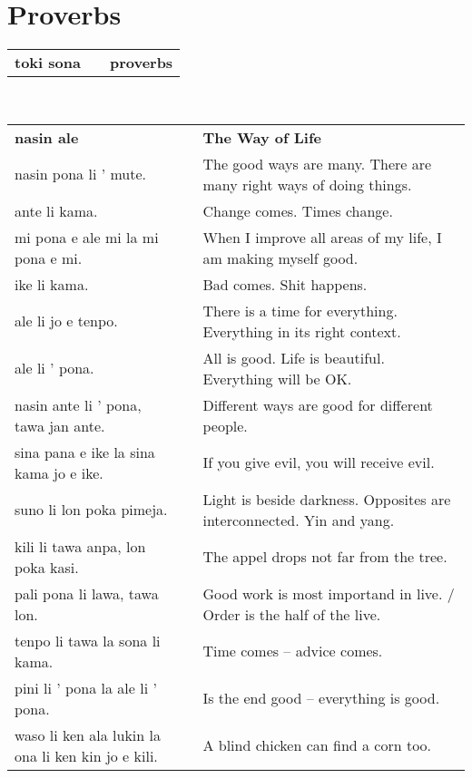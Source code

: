 %
\section{Proverbs}
%
\begin{supertabular}{p{6cm}|ll}
\textbf{toki sona} && \textbf{proverbs} \\
\end{supertabular} \\
%
\begin{supertabular}{p{6cm}|ll}
\textbf{nasin ale} && \textbf{The Way of Life} \\
nasin pona li ' mute. && The good ways are many. There are many right ways of doing things. \\
ante li kama.  && Change comes. Times change.  \\
mi pona e ale mi la mi pona e mi.  && When I improve all areas of my life, I am making myself good.  \\
ike li kama. && Bad comes. Shit happens.  \\ 
ale li jo e tenpo.  && There is a time for everything. Everything in its right context. \\
ale li ' pona.  && All is good. Life is beautiful. Everything will be OK.  \\
nasin ante li ' pona, tawa jan ante. && Different ways are good for different people. \\ 
sina pana e ike la sina kama jo e ike. && If you give evil, you will receive evil. \\
suno li lon poka pimeja.  && Light is beside darkness. Opposites are interconnected. Yin and yang. \\
kili li tawa anpa, lon poka kasi. && The appel drops not far from the tree. \\
pali pona li lawa, tawa lon. && Good work is most importand in live. / Order is the half of the live. \\
tenpo li tawa la sona li kama. && Time comes -- advice comes. \\
pini li ' pona la ale li ' pona. && Is the end good -- everything is good. \\
waso li ken ala lukin la ona li ken kin jo e kili. && A blind chicken can find a corn too. \\
\end{supertabular} \\
